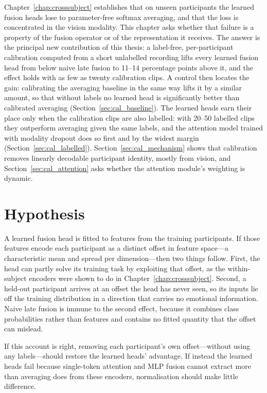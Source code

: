 Chapter~\ref{chap:crosssubject} establishes that on unseen participants the learned
fusion heads lose to parameter-free softmax averaging, and that the loss is
concentrated in the vision modality. This chapter asks whether that failure is a
property of the fusion operator or of the representation it receives. The answer is
the principal new contribution of this thesis: a label-free, per-participant
calibration computed from a short unlabelled recording lifts every learned fusion head
from below naive late fusion to 11--14 percentage points above it, and the effect holds
with as few as twenty calibration clips. A control then locates the gain: calibrating
the averaging baseline in the same way lifts it by a similar amount, so that without
labels no learned head is significantly better than calibrated averaging
(Section~\ref{sec:cal_baseline}). The learned heads earn their place only when the
calibration clips are also labelled: with 20--50 labelled clips they outperform averaging
given the same labels, and the attention model trained with modality dropout does so
first and by the widest margin (Section~\ref{sec:cal_labelled}). Section~\ref{sec:cal_mechanism} shows that calibration removes linearly
decodable participant identity, mostly from vision, and
Section~\ref{sec:cal_attention} asks whether the attention module's weighting is
dynamic.

\section{Hypothesis}
\label{sec:cal_hypothesis}

A learned fusion head is fitted to features from the training participants. If
those features encode each participant as a distinct offset in feature space---a
characteristic mean and spread per dimension---then two things follow. First, the
head can partly solve its training task by exploiting that offset, as the
within-subject encoders were shown to do in Chapter~\ref{chap:crosssubject}. Second,
a held-out participant arrives at an offset the head has never seen, so its inputs
lie off the training distribution in a direction that carries no emotional
information. Naive late fusion is immune to the second effect, because it combines
class probabilities rather than features and contains no fitted quantity that the
offset can mislead.

If this account is right, removing each participant's own offset---without using any
labels---should restore the learned heads' advantage. If instead the learned heads
fail because single-token attention and MLP fusion cannot extract more than averaging
does from these encoders, normalisation should make little difference.

